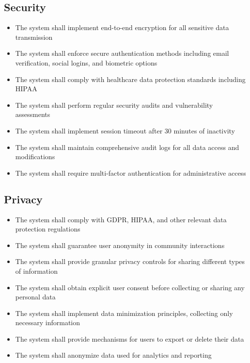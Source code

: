 \subsection{Security}
\begin{itemize}
    \item The system shall implement end-to-end encryption for all sensitive data transmission
    \item The system shall enforce secure authentication methods including email verification, social logins, and biometric options
    \item The system shall comply with healthcare data protection standards including HIPAA
    \item The system shall perform regular security audits and vulnerability assessments
    \item The system shall implement session timeout after 30 minutes of inactivity
    \item The system shall maintain comprehensive audit logs for all data access and modifications
    \item The system shall require multi-factor authentication for administrative access
\end{itemize}

\subsection{Privacy}
\begin{itemize}
    \item The system shall comply with GDPR, HIPAA, and other relevant data protection regulations
    \item The system shall guarantee user anonymity in community interactions
    \item The system shall provide granular privacy controls for sharing different types of information
    \item The system shall obtain explicit user consent before collecting or sharing any personal data
    \item The system shall implement data minimization principles, collecting only necessary information
    \item The system shall provide mechanisms for users to export or delete their data
    \item The system shall anonymize data used for analytics and reporting
\end{itemize}

